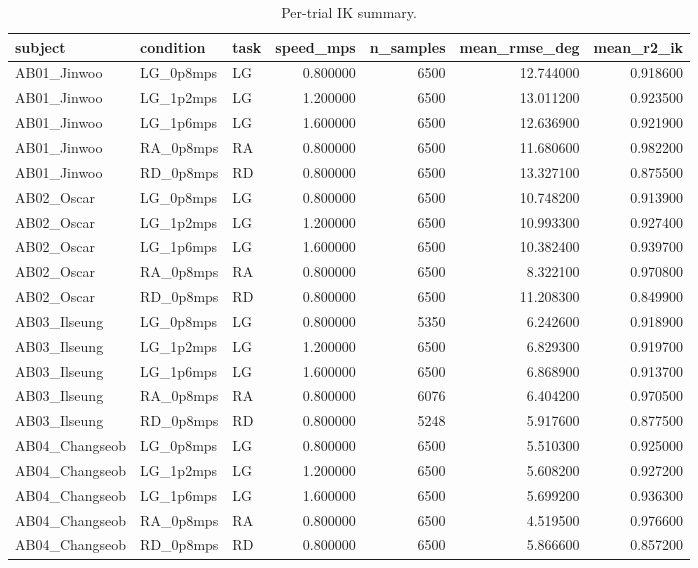 \begin{table}
\caption{Per-trial IK summary.}
\label{tab:table4_ik_per_trial}
\begin{tabular}{lllrrrr}
\toprule
subject & condition & task & speed\_mps & n\_samples & mean\_rmse\_deg & mean\_r2\_ik \\
\midrule
AB01\_Jinwoo & LG\_0p8mps & LG & 0.800000 & 6500 & 12.744000 & 0.918600 \\
AB01\_Jinwoo & LG\_1p2mps & LG & 1.200000 & 6500 & 13.011200 & 0.923500 \\
AB01\_Jinwoo & LG\_1p6mps & LG & 1.600000 & 6500 & 12.636900 & 0.921900 \\
AB01\_Jinwoo & RA\_0p8mps & RA & 0.800000 & 6500 & 11.680600 & 0.982200 \\
AB01\_Jinwoo & RD\_0p8mps & RD & 0.800000 & 6500 & 13.327100 & 0.875500 \\
AB02\_Oscar & LG\_0p8mps & LG & 0.800000 & 6500 & 10.748200 & 0.913900 \\
AB02\_Oscar & LG\_1p2mps & LG & 1.200000 & 6500 & 10.993300 & 0.927400 \\
AB02\_Oscar & LG\_1p6mps & LG & 1.600000 & 6500 & 10.382400 & 0.939700 \\
AB02\_Oscar & RA\_0p8mps & RA & 0.800000 & 6500 & 8.322100 & 0.970800 \\
AB02\_Oscar & RD\_0p8mps & RD & 0.800000 & 6500 & 11.208300 & 0.849900 \\
AB03\_Ilseung & LG\_0p8mps & LG & 0.800000 & 5350 & 6.242600 & 0.918900 \\
AB03\_Ilseung & LG\_1p2mps & LG & 1.200000 & 6500 & 6.829300 & 0.919700 \\
AB03\_Ilseung & LG\_1p6mps & LG & 1.600000 & 6500 & 6.868900 & 0.913700 \\
AB03\_Ilseung & RA\_0p8mps & RA & 0.800000 & 6076 & 6.404200 & 0.970500 \\
AB03\_Ilseung & RD\_0p8mps & RD & 0.800000 & 5248 & 5.917600 & 0.877500 \\
AB04\_Changseob & LG\_0p8mps & LG & 0.800000 & 6500 & 5.510300 & 0.925000 \\
AB04\_Changseob & LG\_1p2mps & LG & 1.200000 & 6500 & 5.608200 & 0.927200 \\
AB04\_Changseob & LG\_1p6mps & LG & 1.600000 & 6500 & 5.699200 & 0.936300 \\
AB04\_Changseob & RA\_0p8mps & RA & 0.800000 & 6500 & 4.519500 & 0.976600 \\
AB04\_Changseob & RD\_0p8mps & RD & 0.800000 & 6500 & 5.866600 & 0.857200 \\

\end{tabular}
\end{table}
